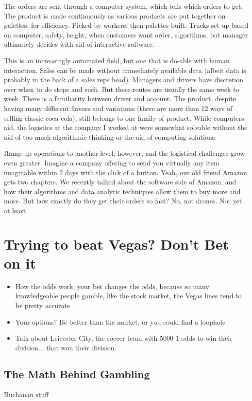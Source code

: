 \documentclass[12pt,twoside]{book}
\begin{document}
\begin{itemize}
	The orders are sent through a computer system, which tells which orders to get.  The product is made continuously as various products are put together on palettes, for efficiency.  Picked by workers, then palettes built.  Trucks set up based on computer, safety, height, when customers want order, algorithms, but manager ultimately decides with aid of interactive software. 
	
	This is an increasingly automated field, but one that is do-able with human interaction. Sales can be made without immediately available data (albeit data is probably in the back of a sales reps head).  Managers and drivers have discretion over when to do stops and such.  But these routes are usually the same week to week.  There is a familiarity between driver and account.  The product, despite having many different flavors and variations (there are more than 12 ways of selling classic coca cola), still belongs to one family of product.  While computers aid, the logistics at the company I worked at were somewhat solvable without the aid of too much algorithmic thinking or the aid of computing solutions.  
	
	Ramp up operations to another level, however, and the logistical challenges grow even greater.  Imagine a company offering to send you virtually any item imaginable within 2 days with the click of a button.  Yeah, our old friend Amazon gets two chapters.  We recently talked about the software side of Amazon, and how their algorithms and data analytic techniques allow them to buy more and more.  But how exactly do they get their orders so fast?  No, not drones.  Not yet at least.  
\end{itemize}
	\chapter{Trying to beat Vegas?  Don't Bet on it}
	\begin{itemize}
		\item How the odds work, your bet changes the odds, because so many knowledgeable people gamble, like the stock market, the Vegas lines tend to be pretty accurate
		\item Your options?  Be better than the market, or you could find a loophole
		\item Talk about Leicester City, the soccer team with 5000-1 odds to win their division$\ldots$ that won their division.
	\end{itemize}
	\section{The Math Behind Gambling}
	Buchanan stuff
\end{document}
